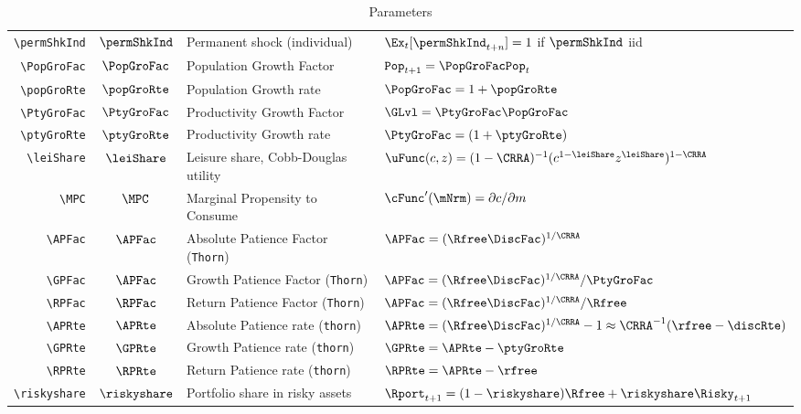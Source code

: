 \documentclass[12pt]{\econtex}
\begin{document}
\begin{table}[ht]
\begin{tabular}{|>{\ttfamily}rcll|}
    \\ \verb|\permShkInd|  & $\permShkInd$ & Permanent shock (individual) & $\Ex_{t}[\permShkInd_{t+n}]=1$ if $\permShkInd$ iid
    \\ \verb|\PopGroFac|      & $\PopGroFac$ & Population Growth Factor & $\mathtt{Pop}_{t+1} = \PopGroFac \mathtt{Pop}_{t}$
    \\ \verb|\popGroRte|      & $\popGroRte$ & Population Growth rate & $\PopGroFac = 1 + \popGroRte$
    \\ \verb|\PtyGroFac|      & $\PtyGroFac$ & Productivity Growth Factor & $\GLvl = \PtyGroFac \PopGroFac$
    \\ \verb|\ptyGroRte|      & $\ptyGroRte$ & Productivity Growth rate & $\PtyGroFac = (1+\ptyGroRte)$
    \\ \verb|\leiShare|    & $\leiShare$ & Leisure share, Cobb-Douglas utility & $\uFunc(c,z)=(1-\CRRA)^{-1}(c^{1-\leiShare}z^{\leiShare})^{1-\CRRA}$
    \\ \verb|\MPC|         & $\MPC$ & Marginal Propensity to Consume & $\cFunc^{\prime}(\mNrm)=\partial c/\partial m$
    \\ \verb|\APFac|       & $\APFac$ & Absolute Patience Factor (\texttt{Thorn}) & $\APFac = (\Rfree \DiscFac)^{1/\CRRA} $
    \\ \verb|\GPFac|       & $\APFac$ & Growth Patience Factor (\texttt{Thorn}) & $\APFac = (\Rfree \DiscFac)^{1/\CRRA}/\PtyGroFac$
    \\ \verb|\RPFac|       & $\RPFac$ & Return Patience Factor (\texttt{Thorn}) & $\APFac = (\Rfree \DiscFac)^{1/\CRRA}/\Rfree $
    \\ \verb|\APRte|       & $\APRte$ & Absolute Patience rate (\texttt{thorn}) & $\APRte = (\Rfree \DiscFac)^{1/\CRRA}-1 \approx \CRRA^{-1}(\rfree-\discRte) $
    \\ \verb|\GPRte|       & $\GPRte$ & Growth Patience rate (\texttt{thorn}) & $\GPRte = \APRte -\ptyGroRte $
    \\ \verb|\RPRte|        & $\RPRte$ & Return Patience rate (\texttt{thorn}) & $\RPRte =\APRte -\rfree $
    \\ \verb|\riskyshare|  & $\riskyshare$ & Portfolio share in risky assets & $\Rport_{t+1}=(1-\riskyshare)\Rfree+\riskyshare\Risky_{t+1}$
    \\	\hline
  \end{tabular}
  \caption{Parameters}
  \label{table:Parameters}
\end{table}
\end{document}
